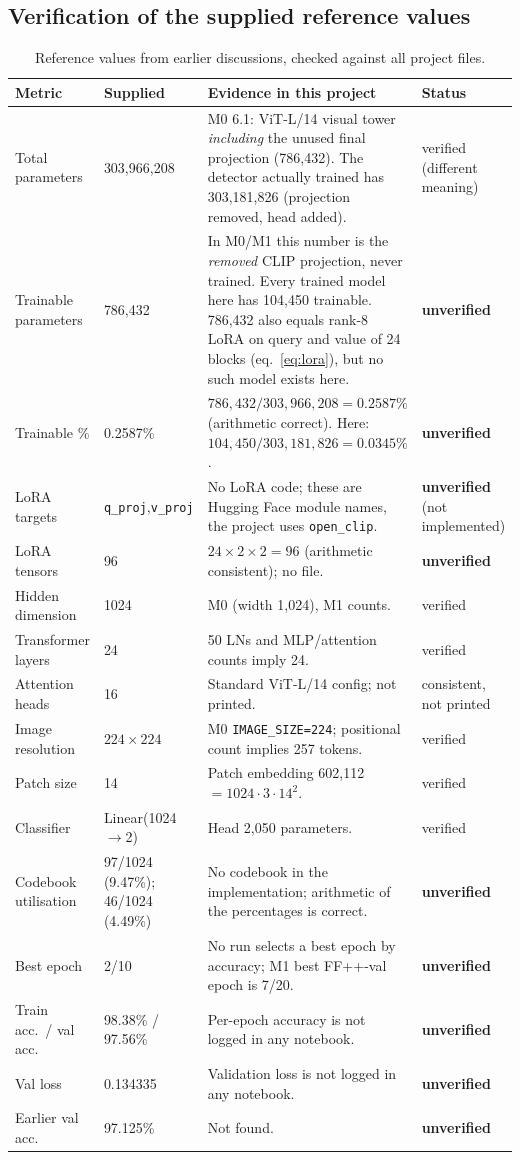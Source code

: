 \documentclass[10pt,a4paper]{article}
\newcommand{\Unv}{\textcolor{fail}{\textbf{unverified}}}
\begin{document}
\subsection{Verification of the supplied reference values}\label{sec:verify}
\begin{table}[H]\centering\scriptsize
\caption{Reference values from earlier discussions, checked against all project files.}\label{tab:verify}
\begin{tabularx}{\linewidth}{@{}L{2.8cm}L{1.9cm}YL{2.0cm}@{}}
\toprule
Metric & Supplied & Evidence in this project & Status\\
\midrule
Total parameters & 303,966,208 & M0 6.1: ViT-L/14 visual tower \emph{including} the unused final projection (786,432). The detector actually trained has 303,181,826 (projection removed, head added). & verified (different meaning)\\
Trainable parameters & 786,432 & In M0/M1 this number is the \emph{removed} CLIP projection, never trained. Every trained model here has 104,450 trainable. 786,432 also equals rank-8 LoRA on query and value of 24 blocks (eq.~\ref{eq:lora}), but no such model exists here. & \Unv\\
Trainable \% & 0.2587\% & \(786{,}432/303{,}966{,}208=0.2587\%\) (arithmetic correct). Here: \(104{,}450/303{,}181{,}826=0.0345\%\). & \Unv\\
LoRA targets & \texttt{q\_proj},\newline\texttt{v\_proj} & No LoRA code; these are Hugging Face module names, the project uses \texttt{open\_clip}. & \Unv{} (not implemented)\\
LoRA tensors & 96 & \(24\times2\times2=96\) (arithmetic consistent); no file. & \Unv\\
Hidden dimension & 1024 & M0 (width 1,024), M1 counts. & verified\\
Transformer layers & 24 & 50 LNs and MLP/attention counts imply 24. & verified\\
Attention heads & 16 & Standard ViT-L/14 config; not printed. & consistent, not printed\\
Image resolution & \(224\times224\) & M0 \texttt{IMAGE\_SIZE=224}; positional count implies 257 tokens. & verified\\
Patch size & 14 & Patch embedding 602,112 \(=1024\cdot3\cdot14^2\). & verified\\
Classifier & Linear(1024\(\to\)2) & Head 2,050 parameters. & verified\\
Codebook utilisation & 97/1024 (9.47\%); 46/1024 (4.49\%) & No codebook in the implementation; arithmetic of the percentages is correct. & \Unv\\
Best epoch & 2/10 & No run selects a best epoch by accuracy; M1 best FF++-val epoch is 7/20. & \Unv\\
Train acc.\ / val acc.\ & 98.38\% / 97.56\% & Per-epoch accuracy is not logged in any notebook. & \Unv\\
Val loss & 0.134335 & Validation loss is not logged in any notebook. & \Unv\\
Earlier val acc. & 97.125\% & Not found. & \Unv\\
\bottomrule
\end{tabularx}
\end{table}
\end{document}
